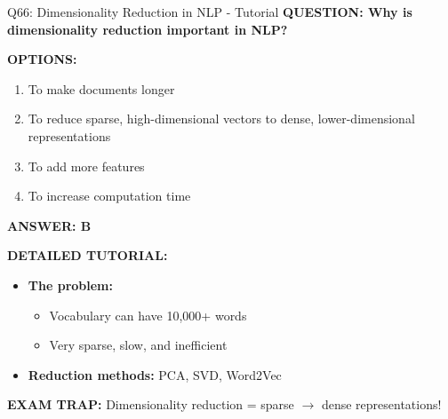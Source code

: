 \documentclass[8pt]{beamer}
\begin{document}
	\begin{frame}{Q66: Dimensionality Reduction in NLP - Tutorial}
		\fontsize{6.5}{7.5}\selectfont
		\textbf{QUESTION: Why is dimensionality reduction important in NLP?}
		
		\vspace{0.1cm}
		\textbf{OPTIONS:}
		\begin{enumerate}
			\item To make documents longer
			\item To reduce sparse, high-dimensional vectors to dense, lower-dimensional representations
			\item To add more features
			\item To increase computation time
		\end{enumerate}
		
		\vspace{0.1cm}
		\textcolor{myblue}{\textbf{ANSWER: B}}
		
		\vspace{0.1cm}
		\textbf{DETAILED TUTORIAL:}
		\begin{itemize}
			\item \textbf{The problem:}
			\begin{itemize}
				\item Vocabulary can have 10,000+ words
				\item Very sparse, slow, and inefficient
			\end{itemize}
			\item \textbf{Reduction methods:} PCA, SVD, Word2Vec
		\end{itemize}
		
		\textcolor{myred}{\textbf{EXAM TRAP:}} Dimensionality reduction = \textcolor{myblue}{sparse $\to$ dense} representations!
	\end{frame}
	
\end{document}
